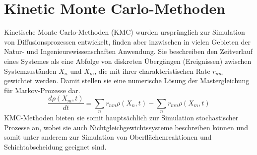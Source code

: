 \section{Kinetic Monte Carlo-Methoden}
\label{kmc}

Kinetische Monte Carlo-Methoden (KMC)\cite{voter_introduction_2007} wurden ursprünglich zur Simulation von Diffusionsprozessen entwickelt, finden aber inzwischen in vielen Gebieten der Natur- und Ingenieurswissenschaften Anwendung.
Sie beschreiben den Zeitverlauf eines Systemes als eine Abfolge von diskreten Übergängen (Ereignissen) zwischen Systemzuständen $X_n$ und $X_m$, die mit ihrer charakteristischen Rate $r_{n m}$ gewichtet werden.
Damit stellen sie eine numerische Lösung der Mastergleichung für Markov-Prozesse dar.
\begin{equation}
  \frac{d \rho(X_m,t)}{d t} = \sum_n{r_{n m}\rho(X_n,t) - \sum_n{r_{m n}\rho(X_m,t)}}
\end{equation}
KMC-Methoden bieten sie somit hauptsächlich zur Simulation stochastischer Prozesse an, wobei sie auch Nichtgleichgewichtssysteme beschreiben können und somit unter anderem zur Simulation von Oberflächenreaktionen und Schichtabscheidung geeignet sind\cite{battaile_kinetic_2008}.

